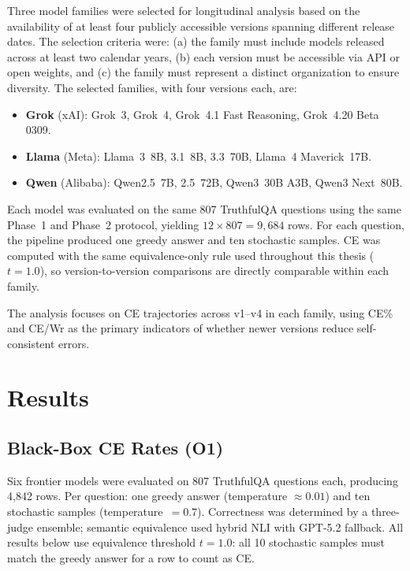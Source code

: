 \documentclass[12pt,twocolumn]{article}
\begin{document}
Three model families were selected for longitudinal analysis based on
the availability of at least four publicly accessible versions spanning
different release dates. The selection criteria were: (a) the family
must include models released across at least two calendar years,
(b) each version must be accessible via API or open weights, and
(c) the family must represent a distinct organization to ensure
diversity. The selected families, with four versions each, are:
\begin{itemize}[nosep]
\item \textbf{Grok} (xAI): Grok~3, Grok~4, Grok~4.1 Fast
      Reasoning, Grok~4.20 Beta 0309.
\item \textbf{Llama} (Meta): Llama~3~8B,
      3.1~8B, 3.3~70B, Llama~4 Maverick~17B.
\item \textbf{Qwen} (Alibaba): Qwen2.5~7B,
      2.5~72B, Qwen3~30B A3B, Qwen3 Next~80B.
\end{itemize}

Each model was evaluated on the same 807 TruthfulQA questions using
the same Phase~1 and Phase~2 protocol, yielding
$12 \times 807 = 9{,}684$ rows. For each question, the pipeline
produced one greedy answer and ten stochastic samples. CE was computed
with the same equivalence-only rule used throughout this thesis
($t{=}1.0$), so version-to-version comparisons are directly
comparable within each family.

The analysis focuses on CE trajectories across v1--v4 in each family,
using CE\% and CE/Wr as the primary indicators of whether newer
versions reduce self-consistent errors.

\section{Results}
\label{sec:results}

\subsection{Black-Box CE Rates (O1)}
\label{sec:results-bb}

Six frontier models were evaluated on 807 TruthfulQA questions each,
producing 4,842 rows. Per question: one greedy answer (temperature
$\approx 0.01$) and ten stochastic samples (temperature~$= 0.7$).
Correctness was determined by a three-judge ensemble; semantic
equivalence used hybrid NLI with GPT-5.2 fallback. All results
below use equivalence threshold $t{=}1.0$: all 10 stochastic
samples must match the greedy answer for a row to count as CE.
\end{document}
